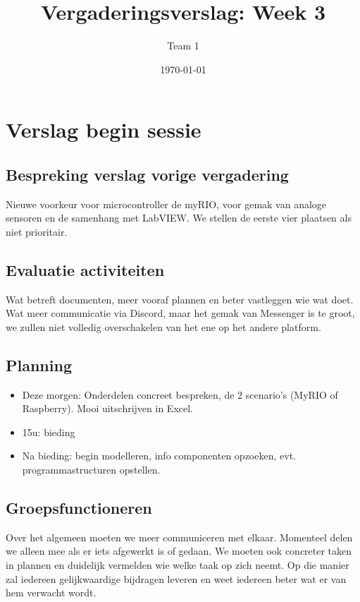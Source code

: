 \documentclass[a4paper,kulak]{kulakarticle} %
\date{\today}
\title{Vergaderingsverslag: Week 3}
\author{Team 1}
\begin{document}
\maketitle

\section{Verslag begin sessie}

\subsection{Bespreking verslag vorige vergadering}
Nieuwe voorkeur voor microcontroller de myRIO, voor gemak van analoge sensoren en de samenhang met LabVIEW. We stellen de eerste vier plaatsen als niet prioritair. 

\subsection{Evaluatie activiteiten}
Wat betreft documenten, meer vooraf plannen en beter vastleggen wie wat doet.
Wat meer communicatie via Discord, maar het gemak van Messenger is te groot, we zullen niet volledig overschakelen van het ene op het andere platform. 


\subsection{Planning}

\begin{itemize}
\item Deze morgen: Onderdelen concreet bespreken, de 2 scenario's (MyRIO of Raspberry). Mooi uitschrijven in Excel. 

\item 15u: bieding

\item Na bieding: begin modelleren, info componenten opzoeken, evt. programmastructuren opstellen.

\end{itemize}

\subsection{Groepsfunctioneren}
Over het algemeen moeten we meer communiceren met elkaar. Momenteel delen we alleen mee als er iets afgewerkt is of gedaan. We moeten ook concreter taken in plannen en duidelijk vermelden wie welke taak op zich neemt. Op die manier zal iedereen gelijkwaardige bijdragen leveren en weet iedereen beter wat er van hem verwacht wordt.
\end{document}
